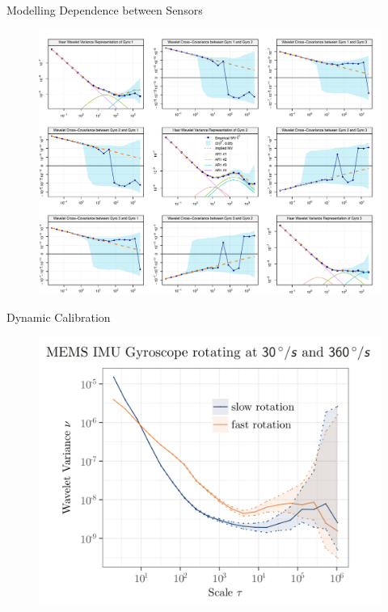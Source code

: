\documentclass[envcountsect,usenames,dvipsnames]{beamer}
\theoremstyle{mystyle}
\begin{document}
\begin{frame}{Modelling Dependence between Sensors}
    \begin{figure}
        \centering
        \includegraphics[scale = 0.64]{Images/niakette.pdf}
    \end{figure}
\end{frame}


\begin{frame}{Dynamic Calibration}
    \begin{figure}
        \centering
        \includegraphics[scale = 0.35]{Images/pilou1.png}
    \end{figure}
\end{frame}
\end{document}
